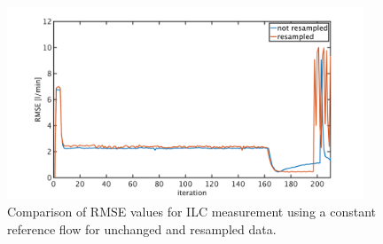 \begin{figure}[ht!]
  \centering
  \includegraphics[width=0.95\textwidth]{images/chapt_5/ILC/RMSE_ilc_var_dist_comp_const.pdf}
  \caption[Comparison of RMSE values for ILC measurement using a constant reference flow for unchanged and resampled data]{Comparison of RMSE values for ILC measurement using a constant reference flow for unchanged and resampled data.}
  \label{fig:RMSE_ilc_var_dist_comp_const}
\end{figure}

